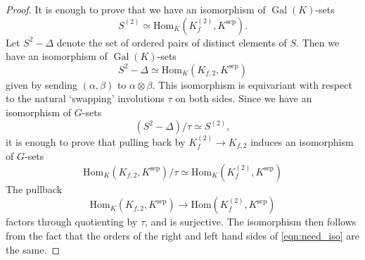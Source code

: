 \documentclass[10pt,a4paper]{amsart}
\DeclareMathOperator{\Gal}{Gal}
\newcommand{\Hom}{\mathrm{Hom}}
\newcommand{\sep}{\mathrm{sep}}
\begin{document}
\begin{proof}
It is enough to prove that we have an isomorphism of $\Gal (K)$-sets
\[
S^{(2)}\simeq \Hom _K (K_f ^{(2)},K^{\sep }).
\]
Let $S^2 -\Delta $ denote the set of ordered pairs of distinct elements of $S$. Then we have an isomorphism of $\Gal (K)$-sets
\[
S^2 -\Delta \simeq \Hom _K (K_{f,2},K^{\sep })
\]
given by sending $(\alpha ,\beta )$ to $\alpha \otimes \beta $. This isomorphism is equivariant with respect to the natural `swapping' involutions $\tau $ on both sides. Since we have an isomorphism of $G$-sets 
\[
(S^2 -\Delta )/\tau \simeq S^{(2)},
\]
it is enough to prove that pulling back by $K_f ^{(2)}\to K_{f,2}$ induces an isomorphism of $G$-sets
\begin{equation}\label{eqn:need_iso}
\Hom _K (K_{f,2},K^{\sep })/\tau \simeq \Hom _K (K_f ^{(2)},K^{\sep })
\end{equation}
The pullback
\[
\Hom _K (K_{f,2},K^{\sep })\to \Hom (K_f ^{(2)},K^{\sep })
\]
factors through quotienting by $\tau $, and is surjective. The isomorphism then follows from the fact that the orders of the right and left hand sides of \eqref{eqn:need_iso} are the same.
\end{proof}
\end{document}
